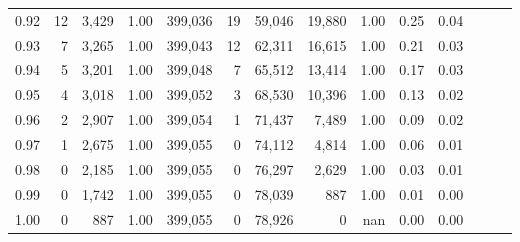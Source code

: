 \begin{tabular}{rrrrrrrrrrrrrr}
0.92 &     12 &  3,429 &  1.00 &  399,036 &       19 &  59,046 &  19,880 &  1.00 &  0.25 &      0.04 \\
0.93 &      7 &  3,265 &  1.00 &  399,043 &       12 &  62,311 &  16,615 &  1.00 &  0.21 &      0.03 \\
0.94 &      5 &  3,201 &  1.00 &  399,048 &        7 &  65,512 &  13,414 &  1.00 &  0.17 &      0.03 \\
0.95 &      4 &  3,018 &  1.00 &  399,052 &        3 &  68,530 &  10,396 &  1.00 &  0.13 &      0.02 \\
0.96 &      2 &  2,907 &  1.00 &  399,054 &        1 &  71,437 &   7,489 &  1.00 &  0.09 &      0.02 \\
0.97 &      1 &  2,675 &  1.00 &  399,055 &        0 &  74,112 &   4,814 &  1.00 &  0.06 &      0.01 \\
0.98 &      0 &  2,185 &  1.00 &  399,055 &        0 &  76,297 &   2,629 &  1.00 &  0.03 &      0.01 \\
0.99 &      0 &  1,742 &  1.00 &  399,055 &        0 &  78,039 &     887 &  1.00 &  0.01 &      0.00 \\
1.00 &      0 &    887 &  1.00 &  399,055 &        0 &  78,926 &       0 &   nan &  0.00 &      0.00 \\
\bottomrule
\end{tabular}
